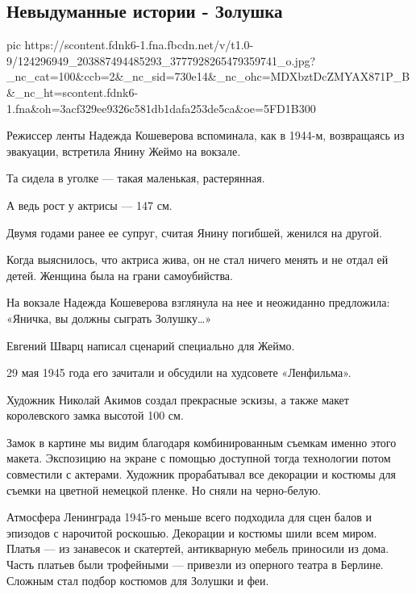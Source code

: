  
 
 

\subsection{Невыдуманные истории - Золушка}
\label{sec:10_11_2020.fb.georgii_protoierei.1.zolushka_film}


\ifcmt
pic https://scontent.fdnk6-1.fna.fbcdn.net/v/t1.0-9/124296949_203887494485293_3777928265479359741_o.jpg?_nc_cat=100&ccb=2&_nc_sid=730e14&_nc_ohc=MDXbztDcZMYAX871P_B&_nc_ht=scontent.fdnk6-1.fna&oh=3acf329ee9326c581db1dafa253de5ca&oe=5FD1B300
\fi

Режиссер ленты Надежда Кошеверова вспоминала, как в 1944-м, возвращаясь из
эвакуации, встретила Янину Жеймо на вокзале.

Та сидела в уголке --- такая маленькая, растерянная.

А ведь рост у актрисы --- 147 см.

Двумя годами ранее ее супруг, считая Янину погибшей, женился на другой.

Когда выяснилось, что актриса жива, он не стал ничего менять и не отдал ей
детей.  Женщина была на грани самоубийства.

На вокзале Надежда Кошеверова взглянула на нее и неожиданно предложила:
«Яничка, вы должны сыграть Золушку…»

Евгений Шварц написал сценарий специально для Жеймо.

29 мая 1945 года его зачитали и обсудили на худсовете «Ленфильма».

Художник Николай Акимов создал прекрасные эскизы, а также макет королевского
замка высотой 100 см.

Замок в картине мы видим благодаря комбинированным съемкам именно этого макета.
Экспозицию на экране с помощью доступной тогда технологии потом совместили с
актерами. Художник прорабатывал все декорации и костюмы для съемки на цветной
немецкой пленке. Но сняли на черно-белую.

Атмосфера Ленинграда 1945-го меньше всего подходила для сцен балов и эпизодов с
нарочитой роскошью. Декорации и костюмы шили всем миром. Платья --- из занавесок
и скатертей, антикварную мебель приносили из дома. Часть платьев были
трофейными --- привезли из оперного театра в Берлине. Сложным стал подбор
костюмов для Золушки и феи.

